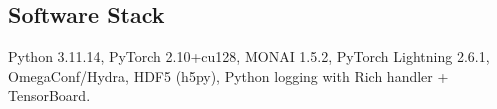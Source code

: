 \subsection{Software Stack}

Python 3.11.14, PyTorch 2.10+cu128, MONAI 1.5.2, PyTorch Lightning 2.6.1,
OmegaConf/Hydra, HDF5 (h5py), Python logging with Rich handler + TensorBoard.
